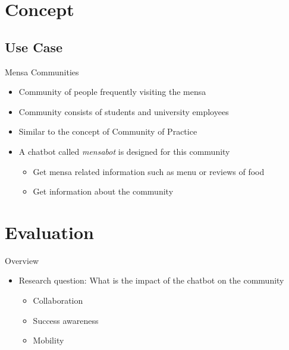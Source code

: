 \section{Concept}
\subsection{Use Case}
\begin{frame}{Mensa Communities}
  \begin{itemize}
    \item Community of people frequently visiting the mensa
    \item Community consists of students and university employees
    \item Similar to the concept of Community of Practice %
    \item A chatbot called \emph{mensabot} is designed for this community
    \begin{itemize}
      \item Get mensa related information such as menu or reviews of food
      \item Get information about the community
    \end{itemize}
  \end{itemize}
\end{frame}



\section{Evaluation}

\begin{frame}{Overview}
  \begin{itemize}
    \item Research question: What is the impact of the chatbot on the community
          \begin{itemize}
            \item Collaboration
            \item Success awareness
            \item Mobility
          \end{itemize}
  \end{itemize}
\end{frame}

